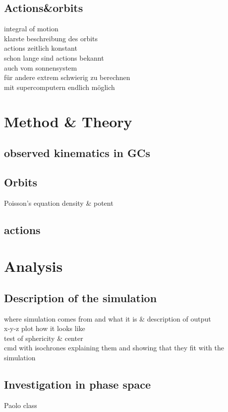 \documentclass[a4paper,12pt,abstracton]{scrartcl}
\begin{document}
\subsection{Actions\&orbits}
integral of motion\\
klarste beschreibung des orbits\\
actions zeitlich konstant\\
schon lange sind actions bekannt\\
auch vom sonnensystem\\
für andere extrem schwierig zu berechnen\\
mit supercomputern endlich möglich


\newpage
\section{Method \& Theory}
\subsection{observed kinematics in GCs}
\subsection{Orbits}
Poisson's equation
density \& potent
\subsection{actions}
\newpage
\section{Analysis}

\subsection{Description of the simulation}
where simulation comes from and what it is \& description of output\\
x-y-z plot how it looks like\\
test of sphericity \& center\\
cmd with isochrones explaining them and showing that they fit with the simulation\\

\subsection{Investigation in phase space}
Paolo class
\end{document}
